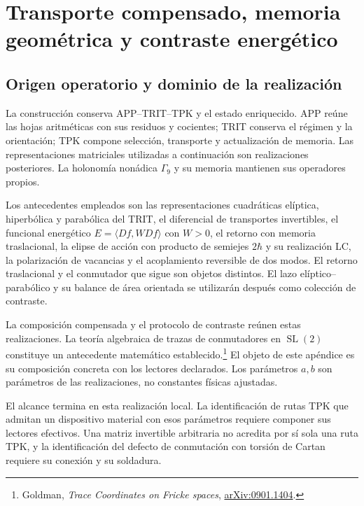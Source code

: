 \section{Transporte compensado, memoria geométrica y contraste energético}
\label{md:aux:transporte}

\subsection{Origen operatorio y dominio de la realización}
\label{md:aux:origen}

La construcción conserva APP--TRIT--TPK y el estado enriquecido. APP
reúne las hojas aritméticas con sus residuos y cocientes; TRIT conserva
el régimen y la orientación; TPK compone selección, transporte y
actualización de memoria. Las representaciones matriciales utilizadas
a continuación son realizaciones posteriores. La holonomía nonádica
$\Gamma_9$ y su memoria mantienen sus operadores propios.

Los antecedentes empleados son las representaciones cuadráticas
elíptica, hiperbólica y parabólica del TRIT, el diferencial de
transportes invertibles, el funcional energético
$E=\langle Df,WDf\rangle$ con $W>0$, el retorno con memoria
traslacional, la elipse de acción con producto de semiejes $2\hbar$
y su realización LC, la polarización de vacancias y el acoplamiento
reversible de dos modos. El retorno traslacional y el conmutador
que sigue son objetos distintos. El lazo elíptico--parabólico y
su balance de área orientada se utilizarán después como colección
de contraste.

La composición compensada y el protocolo de contraste reúnen estas
realizaciones. La teoría algebraica de trazas de conmutadores en
$\operatorname{SL}(2)$ constituye un antecedente matemático
establecido.\footnote{Goldman, \emph{Trace Coordinates on
Fricke spaces}, \href{https://arxiv.org/abs/0901.1404}{arXiv:0901.1404}.}
El objeto de este apéndice es su composición concreta con los
lectores declarados. Los parámetros $a,b$ son parámetros de las
realizaciones, no constantes físicas ajustadas.

El alcance termina en esta realización local. La identificación de
rutas TPK que admitan un dispositivo material con esos parámetros
requiere componer sus lectores efectivos. Una matriz invertible
arbitraria no acredita por sí sola una ruta TPK, y la identificación
del defecto de conmutación con torsión de Cartan requiere su
conexión y su soldadura.

